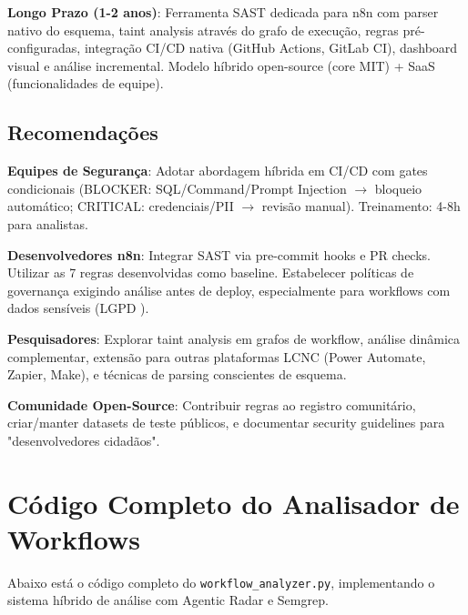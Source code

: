 \documentclass[12pt,a4paper]{article}
\begin{document}
\textbf{Longo Prazo (1-2 anos)}: Ferramenta SAST dedicada para n8n com parser nativo do esquema, taint analysis através do grafo de execução, regras pré-configuradas, integração CI/CD nativa (GitHub Actions, GitLab CI), dashboard visual e análise incremental. Modelo híbrido open-source (core MIT) + SaaS (funcionalidades de equipe).

\subsection{Recomendações}

\textbf{Equipes de Segurança}: Adotar abordagem híbrida em CI/CD com gates condicionais (BLOCKER: SQL/Command/Prompt Injection $\rightarrow$ bloqueio automático; CRITICAL: credenciais/PII $\rightarrow$ revisão manual). Treinamento: 4-8h para analistas.

\textbf{Desenvolvedores n8n}: Integrar SAST via pre-commit hooks e PR checks. Utilizar as 7 regras desenvolvidas como baseline. Estabelecer políticas de governança exigindo análise antes de deploy, especialmente para workflows com dados sensíveis (LGPD \cite{lgpd_lei}).

\textbf{Pesquisadores}: Explorar taint analysis em grafos de workflow, análise dinâmica complementar, extensão para outras plataformas LCNC (Power Automate, Zapier, Make), e técnicas de parsing conscientes de esquema.

\textbf{Comunidade Open-Source}: Contribuir regras ao registro comunitário, criar/manter datasets de teste públicos, e documentar security guidelines para "desenvolvedores cidadãos".

\printbibliography

\appendix

\section{Código Completo do Analisador de Workflows}
\label{appendix:workflow-analyzer}

Abaixo está o código completo do \texttt{workflow\_analyzer.py}, implementando o sistema híbrido de análise com Agentic Radar e Semgrep.
\end{document}

